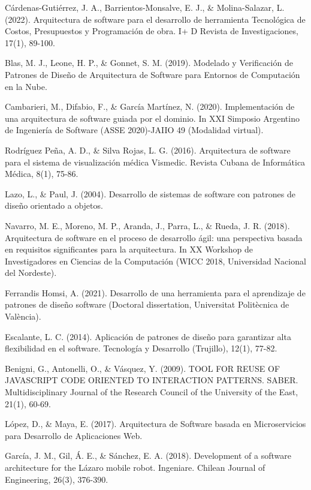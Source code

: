 \documentclass[twocolumn]{article}
\begin{document}
\begin{thebibliography}{99}
 Cárdenas-Gutiérrez, J. A., Barrientos-Monsalve, E. J., \& Molina-Salazar, L. (2022). Arquitectura de software para el desarrollo de herramienta Tecnológica de Costos, Presupuestos y Programación de obra. I+ D Revista de Investigaciones, 17(1), 89-100.

 Blas, M. J., Leone, H. P., \& Gonnet, S. M. (2019). Modelado y Verificación de Patrones de Diseño de Arquitectura de Software para Entornos de Computación en la Nube.

 Cambarieri, M., Difabio, F., \& García Martínez, N. (2020). Implementación de una arquitectura de software guiada por el dominio. In XXI Simposio Argentino de Ingeniería de Software (ASSE 2020)-JAIIO 49 (Modalidad virtual).

 Rodríguez Peña, A. D., \& Silva Rojas, L. G. (2016). Arquitectura de software para el sistema de visualización médica Vismedic. Revista Cubana de Informática Médica, 8(1), 75-86.

 Lazo, L., \& Paul, J. (2004). Desarrollo de sistemas de software con patrones de diseño orientado a objetos.

 Navarro, M. E., Moreno, M. P., Aranda, J., Parra, L., \& Rueda, J. R. (2018). Arquitectura de software en el proceso de desarrollo ágil: una perspectiva basada en requisitos significantes para la arquitectura. In XX Workshop de Investigadores en Ciencias de la Computación (WICC 2018, Universidad Nacional del Nordeste).

 Ferrandis Homsi, A. (2021). Desarrollo de una herramienta para el aprendizaje de patrones de diseño software (Doctoral dissertation, Universitat Politècnica de València).

 Escalante, L. C. (2014). Aplicación de patrones de diseño para garantizar alta flexibilidad en el software. Tecnología y Desarrollo (Trujillo), 12(1), 77-82.

 Benigni, G., Antonelli, O., \& Vásquez, Y. (2009). TOOL FOR REUSE OF JAVASCRIPT CODE ORIENTED TO INTERACTION PATTERNS. SABER. Multidisciplinary Journal of the Research Council of the University of the East, 21(1), 60-69.

 López, D., \& Maya, E. (2017). Arquitectura de Software basada en Microservicios para Desarrollo de Aplicaciones Web.

 García, J. M., Gil, Á. E., \& Sánchez, E. A. (2018). Development of a software architecture for the Lázaro mobile robot. Ingeniare. Chilean Journal of Engineering, 26(3), 376-390.


\end{thebibliography}
\end{document}
